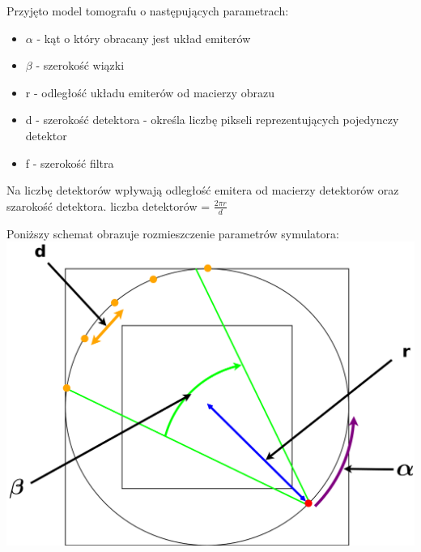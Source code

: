 \documentclass[A_4paper,12pt]{article}
\begin{document}
Przyjęto model tomografu o następujących parametrach:
\begin{itemize}
\item $\alpha$ - kąt o który obracany jest układ emiterów
\item $\beta$ - szerokość wiązki
\item r - odległość układu emiterów od macierzy obrazu
\item d - szerokość detektora - określa liczbę pikseli reprezentujących pojedynczy detektor
\item f - szerokość filtra
\end{itemize}

Na liczbę detektorów wpływają odległość emitera od macierzy detektorów oraz szarokość detektora.
liczba detektorów = $ \frac{2 \pi r }{d} $

Poniższy schemat obrazuje rozmieszczenie parametrów symulatora: \\
\includegraphics[scale=0.4]{schema.png}
\end{document}
